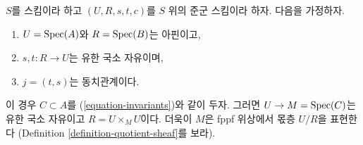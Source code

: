 \begin{proposition}
\label{proposition-finite-flat-equivalence}
$S$를 스킴이라 하고 $(U, R, s, t, c)$를 $S$ 위의 준군 스킴이라 하자. 다음을 가정하자.
\begin{enumerate}
\item $U = \mathop{\mathrm{Spec}}(A)$와 $R = \mathop{\mathrm{Spec}}(B)$는 아핀이고,
\item $s, t : R \to U$는 유한 국소 자유이며,
\item $j = (t, s)$는 동치관계이다.
\end{enumerate}
이 경우 $C \subset A$를 (\ref{equation-invariants})와 같이 두자. 그러면 $U \to M = \mathop{\mathrm{Spec}}(C)$는 유한 국소 자유이고
$R = U \times_M U$이다. 더욱이 $M$은 fppf 위상에서 몫층 $U/R$을 표현한다
(Definition \ref{definition-quotient-sheaf}를 보라).
\end{proposition}

